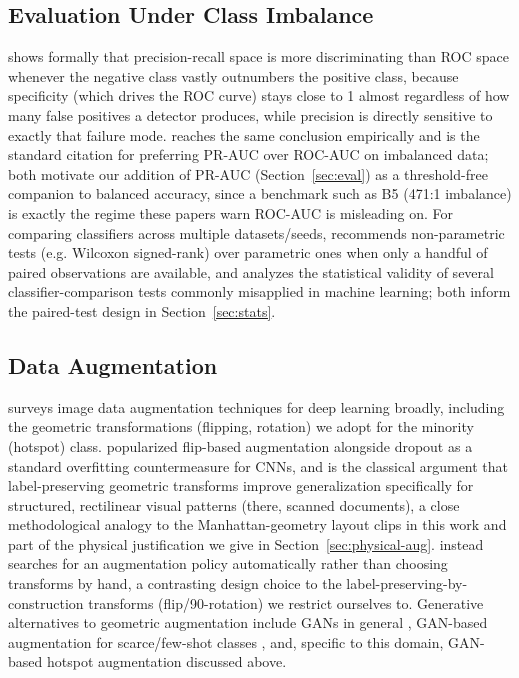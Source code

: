 \documentclass[conference]{IEEEtran}
\begin{document}
\subsection{Evaluation Under Class Imbalance}
\label{sec:evalrelatedwork}
\cite{davis2006relationship} shows formally that precision-recall
space is more discriminating than ROC space whenever the negative
class vastly outnumbers the positive class, because specificity (which
drives the ROC curve) stays close to 1 almost regardless of how many
false positives a detector produces, while precision is directly
sensitive to exactly that failure mode. \cite{saito2015prplot}
reaches the same conclusion empirically and is the standard citation
for preferring PR-AUC over ROC-AUC on imbalanced data; both motivate
our addition of PR-AUC (Section~\ref{sec:eval}) as a threshold-free
companion to balanced accuracy, since a benchmark such as B5 (471:1
imbalance) is exactly the regime these papers warn ROC-AUC is
misleading on. For comparing classifiers across multiple
datasets/seeds, \cite{demsar2006statistical} recommends non-parametric
tests (e.g. Wilcoxon signed-rank) over parametric ones when only a
handful of paired observations are available, and
\cite{dietterich1998approximate} analyzes the statistical validity of
several classifier-comparison tests commonly misapplied in machine
learning; both inform the paired-test design in
Section~\ref{sec:stats}.

\subsection{Data Augmentation}
\cite{shorten2019survey} surveys image data augmentation techniques
for deep learning broadly, including the geometric transformations
(flipping, rotation) we adopt for the minority (hotspot) class.
\cite{krizhevsky2012alexnet} popularized flip-based augmentation
alongside dropout as a standard overfitting countermeasure for CNNs,
and \cite{simard2003bestpractices} is the classical argument that
label-preserving geometric transforms improve generalization
specifically for structured, rectilinear visual patterns (there,
scanned documents), a close methodological analogy to the
Manhattan-geometry layout clips in this work and part of the physical
justification we give in Section~\ref{sec:physical-aug}.
\cite{cubuk2019autoaugment} instead searches for an augmentation
policy automatically rather than choosing transforms by hand, a
contrasting design choice to the label-preserving-by-construction
transforms (flip/90-rotation) we restrict ourselves to. Generative
alternatives to geometric augmentation include GANs in general
\cite{goodfellow2014gan}, GAN-based augmentation for scarce/few-shot
classes \cite{antoniou2017dagan}, and, specific to this domain,
GAN-based hotspot augmentation \cite{wang2021gan} discussed above.
\end{document}
